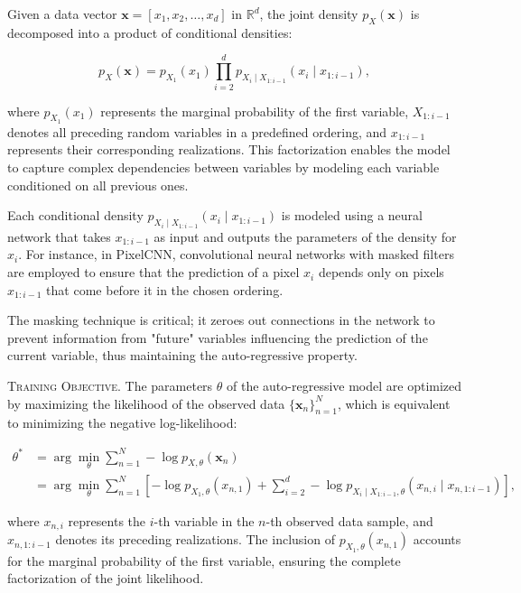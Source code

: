 Given a data vector \( \mathbf{x} = [x_1, x_2, \dots, x_d] \) in \( \mathbb{R}^d \), the joint density \( p_X(\mathbf{x}) \) is decomposed into a product of conditional densities:

\[
p_X(\mathbf{x}) = p_{X_1}(x_1) \prod_{i=2}^{d} p_{X_i \mid X_{1:i-1}}(x_i \mid x_{1:i-1}),
\]

\noindent where \( p_{X_1}(x_1) \) represents the marginal probability of the first variable, \( X_{1:i-1} \) denotes all preceding random variables in a predefined ordering, and \( x_{1:i-1} \) represents their corresponding realizations. This factorization enables the model to capture complex dependencies between variables by modeling each variable conditioned on all previous ones.

Each conditional density \( p_{X_i \mid X_{1:i-1}}(x_i \mid x_{1:i-1}) \) is modeled using a neural network that takes \( x_{1:i-1} \) as input and outputs the parameters of the density for \( x_i \). For instance, in PixelCNN, convolutional neural networks with masked filters are employed to ensure that the prediction of a pixel \( x_i \) depends only on pixels \( x_{1:i-1} \) that come before it in the chosen ordering.

The masking technique is critical; it zeroes out connections in the network to prevent information from "future" variables influencing the prediction of the current variable, thus maintaining the auto-regressive property.

\textsc{Training Objective.} The parameters \( \theta \) of the auto-regressive model are optimized by maximizing the likelihood of the observed data \( \{\mathbf{x}_n\}_{n=1}^N \), which is equivalent to minimizing the negative log-likelihood:

\[
\begin{aligned}
\theta^* &= \arg \min_{\theta} \sum_{n=1}^{N} -\log p_{X,\theta}(\mathbf{x}_n) \\
         &= \arg \min_{\theta} \sum_{n=1}^{N} \left[ -\log p_{X_1,\theta}(x_{n,1}) 
         + \sum_{i=2}^{d} -\log p_{X_i \mid X_{1:i-1}, \theta}(x_{n,i} \mid x_{n,1:i-1}) \right],
\end{aligned}
\]

\noindent where \( x_{n,i} \) represents the \( i \)-th variable in the \( n \)-th observed data sample, and \( x_{n,1:i-1} \) denotes its preceding realizations. The inclusion of \( p_{X_1,\theta}(x_{n,1}) \) accounts for the marginal probability of the first variable, ensuring the complete factorization of the joint likelihood.

